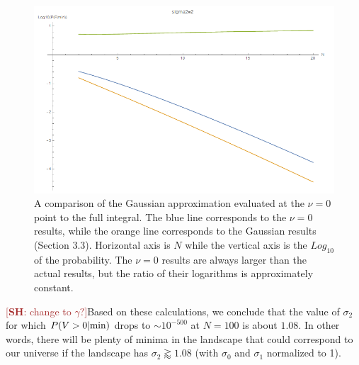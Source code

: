 \documentclass[12pt]{article}
\newcommand{\SH}[1]{\textcolor{brown}{[{\bf SH}: #1]}}
\begin{document}
\begin{figure} 
  \centering
  \includegraphics[width=\linewidth]{sigma2=2v=0.png}
  \caption{A comparison of the Gaussian approximation evaluated at the $\nu=0$ point to the full integral. The blue line corresponds to the $\nu=0$ results, while the orange line corresponds to the Gaussian results (Section 3.3). Horizontal axis is $N$ while the vertical axis is the $Log_{10}$ of the probability. The $\nu=0$ results are always larger than the actual results, but the ratio of their logarithms is approximately constant.}
  \label{sigma2=2v=0}
\end{figure}

\SH{change to $\gamma?$}Based on these calculations, we conclude that the value of $\sigma_2$ for which $P(V>0|{\rm min})$ drops to $\sim 10^{-500}$ at $N = 100$ is about $1.08$. In other words, there will be plenty of minima in the landscape that could correspond to our universe if the landscape has $\sigma_2 \gtrapprox 1.08$ (with $\sigma_0$ and $\sigma_1$ normalized to 1).


\end{document}
